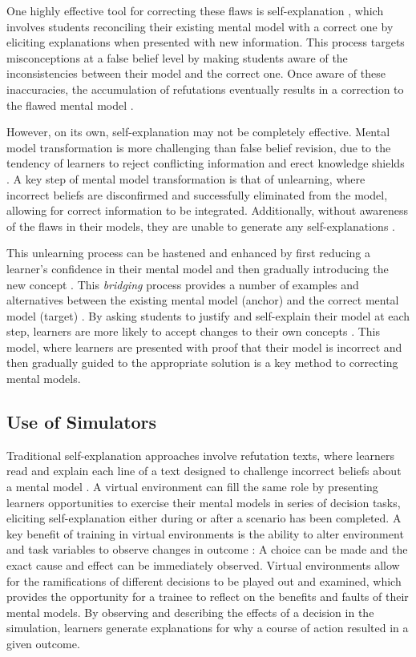 \documentclass{book}
\begin{document}
One highly effective tool for correcting these flaws is self-explanation \citep{Chi1994}, which involves students reconciling their existing mental model with a correct one by eliciting explanations when presented with new information. This process targets misconceptions at a false belief level by making students aware of the inconsistencies between their model and the correct one. Once aware of these inaccuracies, the accumulation of refutations eventually results in a correction to the flawed mental model \citep{Chi2008}.

However, on its own, self-explanation may not be completely effective. Mental model transformation is more challenging than false belief revision, due to the tendency of learners to reject conflicting information and erect knowledge shields \citep{Klein2006}. A key step of mental model transformation is that of unlearning, where incorrect beliefs are disconfirmed and successfully eliminated from the model, allowing for correct information to be integrated. Additionally, without awareness of the flaws in their models, they are unable to generate any self-explanations \citep{Chi2008}.

This unlearning process can be hastened and enhanced by first reducing a learner's confidence in their mental model and then gradually introducing the new concept \citep{Klein2006}. This \emph{bridging} process provides a number of examples and alternatives between the existing mental model (anchor) and the correct mental model (target) \citep{Brown1989}. By asking students to justify and self-explain their model at each step, learners are more likely to accept changes to their own concepts \citep{Brown1989, Chi2008, Chi1994}. This model, where learners are presented with proof that their model is incorrect and then gradually guided to the appropriate solution is a key method to correcting mental models.

\subsection{Use of Simulators}

Traditional self-explanation approaches involve refutation texts, where learners read and explain each line of a text designed to challenge incorrect beliefs about a mental model \citep{Chi1994}. A virtual environment can fill the same role by presenting learners opportunities to exercise their mental models in series of decision tasks, eliciting self-explanation either during or after a scenario has been completed. A key benefit of training in virtual environments is the ability to alter environment and task variables to observe changes in outcome \citep{Klein2006}: A choice can be made and the exact cause and effect can be immediately observed. Virtual environments allow for the ramifications of different decisions to be played out and examined, which provides the opportunity for a trainee to reflect on the benefits and faults of their mental models. By observing and describing the effects of a decision in the simulation, learners generate explanations for why a course of action resulted in a given outcome.
\end{document}
